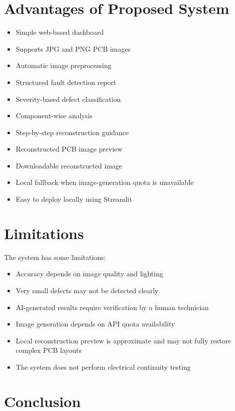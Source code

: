 \documentclass[12pt,a4paper]{report}
\begin{document}
\chapter{Advantages of Proposed System}

\begin{itemize}
    \item Simple web-based dashboard
    \item Supports JPG and PNG PCB images
    \item Automatic image preprocessing
    \item Structured fault detection report
    \item Severity-based defect classification
    \item Component-wise analysis
    \item Step-by-step reconstruction guidance
    \item Reconstructed PCB image preview
    \item Downloadable reconstructed image
    \item Local fallback when image-generation quota is unavailable
    \item Easy to deploy locally using Streamlit
\end{itemize}

\chapter{Limitations}

The system has some limitations:

\begin{itemize}
    \item Accuracy depends on image quality and lighting
    \item Very small defects may not be detected clearly
    \item AI-generated results require verification by a human technician
    \item Image generation depends on API quota availability
    \item Local reconstruction preview is approximate and may not fully restore complex PCB layouts
    \item The system does not perform electrical continuity testing
\end{itemize}

\chapter{Conclusion}
\end{document}

